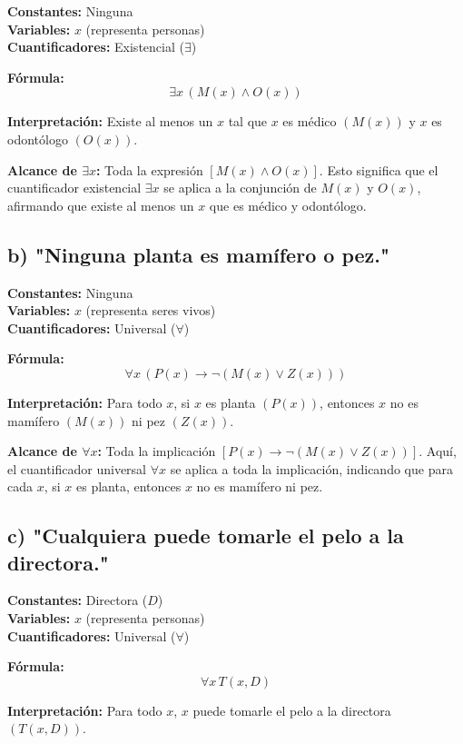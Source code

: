 \documentclass[11pt,letterpaper]{article}
\begin{document}
\textbf{Constantes:} Ninguna \\
\textbf{Variables:} \( x \) (representa personas) \\
\textbf{Cuantificadores:} Existencial (\( \exists \))

\textbf{Fórmula:}
\[
\exists x \, (M(x) \land O(x))
\]

\textbf{Interpretación:} Existe al menos un \( x \) tal que \( x \) es médico \( (M(x)) \) y \( x \) es odontólogo \( (O(x)) \).

\textbf{ Alcance de \( \exists x \):}
Toda la expresión \( [M(x) \land O(x)] \). Esto significa que el cuantificador existencial \( \exists x \) se aplica a la conjunción de \( M(x) \) y \( O(x) \), afirmando que existe al menos un \( x \) que es médico y odontólogo.

\subsection*{b) "Ninguna planta es mamífero o pez."}

\textbf{Constantes:} Ninguna \\
\textbf{Variables:} \( x \) (representa seres vivos) \\
\textbf{Cuantificadores:} Universal (\( \forall \))

\textbf{Fórmula:}
\[
\forall x \, (P(x) \rightarrow \neg (M(x) \lor Z(x)))
\]

\textbf{Interpretación:} Para todo \( x \), si \( x \) es planta \( (P(x)) \), entonces \( x \) no es mamífero \( (M(x)) \) ni pez \( (Z(x)) \).

\textbf{Alcance de \( \forall x \):}
Toda la implicación \( [P(x) \to \neg (M(x) \lor Z(x))] \). Aquí, el cuantificador universal \( \forall x \) se aplica a toda la implicación, indicando que para cada \( x \), si \( x \) es planta, entonces \( x \) no es mamífero ni pez.

\subsection*{c) "Cualquiera puede tomarle el pelo a la directora."}

\textbf{Constantes:} Directora (\( D \)) \\
\textbf{Variables:} \( x \) (representa personas) \\
\textbf{Cuantificadores:} Universal (\( \forall \))

\textbf{Fórmula:}
\[
\forall x \, T(x, D)
\]

\textbf{Interpretación:} Para todo \( x \), \( x \) puede tomarle el pelo a la directora \( (T(x, D)) \).
\end{document}
